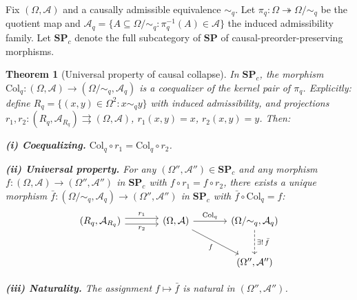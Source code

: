 \documentclass[12pt,a4paper]{article}
\newtheorem{theorem}{Theorem}[section]
\theoremstyle{definition}
\theoremstyle{remark}
\newcommand{\SP}{\mathbf{SP}}
\newcommand{\Col}{\mathrm{Col}}
\begin{document}
Fix $(\Omega,\mathcal{A})$ and a causally admissible equivalence $\sim_q$. Let
$\pi_q:\Omega\twoheadrightarrow\Omega/{\sim_q}$ be the quotient map and
$\mathcal{A}_q=\{A\subseteq\Omega/{\sim_q}:\pi_q^{-1}(A)\in\mathcal{A}\}$ the
induced admissibility family. Let $\SP_c$ denote the full subcategory of $\SP$
of causal-preorder-preserving morphisms.

\begin{theorem}[Universal property of causal collapse]
\label{thm:collapse-universal}
In $\SP_c$, the morphism $\Col_q:(\Omega,\mathcal{A})\to(\Omega/{\sim_q},\mathcal{A}_q)$
is a coequalizer of the kernel pair of $\pi_q$. Explicitly: define
$R_q=\{(x,y)\in\Omega^2:x\sim_q y\}$ with induced admissibility, and projections
$r_1,r_2:(R_q,\mathcal{A}_{R_q})\rightrightarrows(\Omega,\mathcal{A})$,
$r_1(x,y)=x$, $r_2(x,y)=y$. Then:

\medskip
\noindent\textbf{(i) Coequalizing.}
$\Col_q\circ r_1=\Col_q\circ r_2$.

\medskip
\noindent\textbf{(ii) Universal property.}
For any $(\Omega'',\mathcal{A}'')\in\SP_c$ and any morphism
$f:(\Omega,\mathcal{A})\to(\Omega'',\mathcal{A}'')$ in $\SP_c$ with
$f\circ r_1=f\circ r_2$, there exists a unique morphism
$\bar{f}:(\Omega/{\sim_q},\mathcal{A}_q)\to(\Omega'',\mathcal{A}'')$ in $\SP_c$
with $\bar{f}\circ\Col_q=f$:
\[
\begin{tikzcd}[column sep=3.5em, row sep=2.5em]
  (R_q,\mathcal{A}_{R_q})
    \arrow[r, shift left=0.3em, "r_1"]
    \arrow[r, shift right=0.3em, "r_2"']
  &
  (\Omega,\mathcal{A})
    \arrow[r, "\Col_q"]
    \arrow[dr, "f"']
  &
  (\Omega/{\sim_q},\mathcal{A}_q)
    \arrow[d, dashed, "\exists!\,\bar{f}"]
  \\
  & &
  (\Omega'',\mathcal{A}'')
\end{tikzcd}
\]

\medskip
\noindent\textbf{(iii) Naturality.}
The assignment $f\mapsto\bar{f}$ is natural in $(\Omega'',\mathcal{A}'')$.
\end{theorem}
\end{document}
